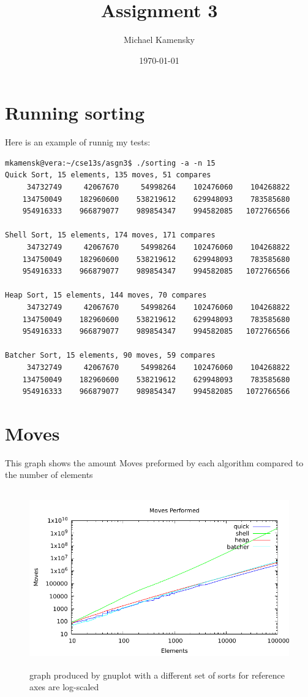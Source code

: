 \documentclass[11pt]{article} %
\title{Assignment 3}
\author{Michael Kamensky}
\date{\today} %
\begin{document}
\maketitle %
\section{Running sorting}
Here is an example of runnig my tests:

\begin{verbatim}
mkamensk@vera:~/cse13s/asgn3$ ./sorting -a -n 15
Quick Sort, 15 elements, 135 moves, 51 compares
     34732749     42067670     54998264    102476060    104268822
    134750049    182960600    538219612    629948093    783585680
    954916333    966879077    989854347    994582085   1072766566

Shell Sort, 15 elements, 174 moves, 171 compares
     34732749     42067670     54998264    102476060    104268822
    134750049    182960600    538219612    629948093    783585680
    954916333    966879077    989854347    994582085   1072766566

Heap Sort, 15 elements, 144 moves, 70 compares
     34732749     42067670     54998264    102476060    104268822
    134750049    182960600    538219612    629948093    783585680
    954916333    966879077    989854347    994582085   1072766566

Batcher Sort, 15 elements, 90 moves, 59 compares
     34732749     42067670     54998264    102476060    104268822
    134750049    182960600    538219612    629948093    783585680
    954916333    966879077    989854347    994582085   1072766566
\end{verbatim}
\section{Moves}
This graph shows the amount Moves preformed by each algorithm compared to the number of elements
\begin{figure}[H]
\begin{center}
\includegraphics[height=3in,width=5in]{sorting.pdf}
\caption{graph produced by gnuplot with a different set of sorts for reference axes are log-scaled}
\end{center}
\end{figure}
\end{document}
